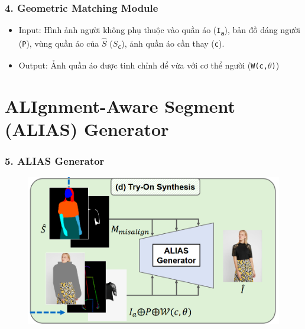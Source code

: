 \documentclass{beamer}
\begin{document}
\begin{frame}
\frametitle{4. Geometric Matching Module}
\begin{itemize}
    \item Input: Hình ảnh người không phụ thuộc vào quần áo (\texttt{I\textsubscript{a}}), bản đồ dáng người (\texttt{P}), vùng quần áo của $\hat{S}$ (\texttt{$\hat{S}$\textsubscript{c}}), ảnh quần áo cần thay (\texttt{c}).
    \item Output: Ảnh quần áo được tinh chỉnh để vừa với cơ thể người (\texttt{W(c,$\theta$)})
\end{itemize}
\end{frame}

\section{ALIgnment-Aware Segment (ALIAS) Generator} 

\begin{frame}
\frametitle{5. ALIAS Generator}

\begin{figure}
    \centering
    \includegraphics[width=1\linewidth]{alias.png}
    
    
\end{figure}

\end{frame}
\end{document}
